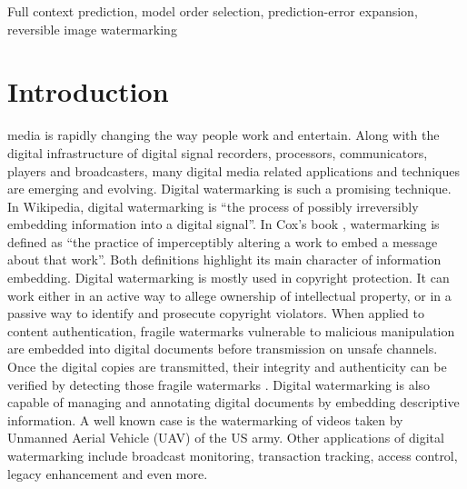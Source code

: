\documentclass[journal]{IEEEtran}
\begin{document}
\begin{IEEEkeywords}
Full context prediction, model order selection, prediction-error expansion, reversible image watermarking
\end{IEEEkeywords}

\IEEEpeerreviewmaketitle

\section{Introduction}

 media is rapidly changing the way people work and entertain. Along with
the digital infrastructure of digital signal recorders, processors, communicators, players and
broadcasters, many digital media related applications and techniques are emerging and evolving.
Digital watermarking is such a promising technique. In Wikipedia, digital watermarking is ``the
process of possibly irreversibly embedding information into a digital signal''. In Cox's book
\cite{Cox06book}, watermarking is defined as ``the practice of imperceptibly altering a work to
embed a message about that work''. Both definitions highlight its main character of information
embedding. Digital watermarking is mostly used in copyright protection. It can work either in an
active way to allege ownership of intellectual property, or in a passive way to identify and
prosecute copyright violators. When applied to content authentication, fragile watermarks vulnerable
to malicious manipulation are embedded into digital documents before transmission on unsafe
channels. Once the digital copies are transmitted, their integrity and authenticity can be verified
by detecting those fragile watermarks \cite{Fridrich02invertibleauth}. Digital watermarking is also
capable of managing and annotating digital documents by embedding descriptive information. A well
known case is the watermarking of videos taken by Unmanned Aerial Vehicle (UAV) of the US
army\cite{Marcinak05}. Other applications of digital watermarking include broadcast monitoring,
transaction tracking, access control, legacy enhancement and even more\cite{Cox06book}.  
\end{document}
